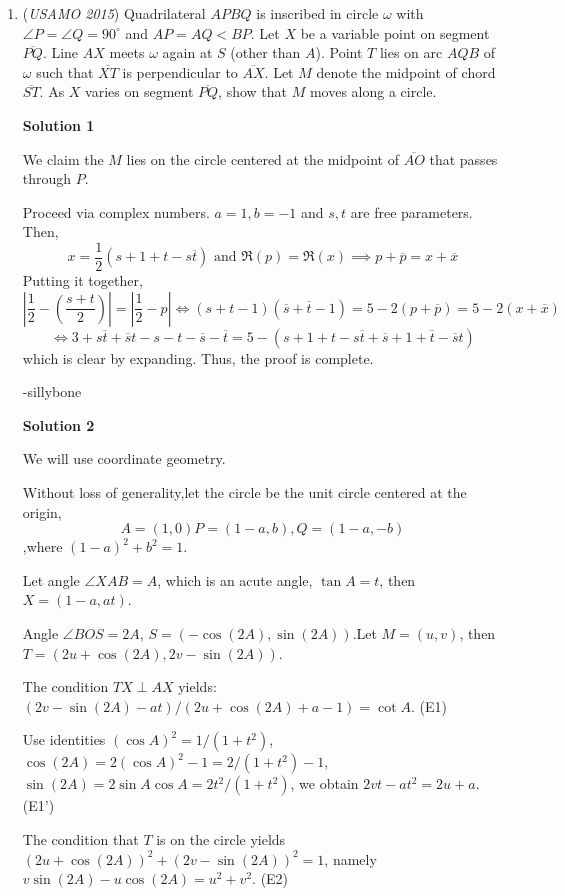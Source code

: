 \begin{enumerate}
 


	\item (\textit{USAMO 2015}) Quadrilateral $APBQ$ is inscribed in circle $\omega$ with $\angle P = \angle Q = 90^{\circ}$ and $AP = AQ < BP$. Let $X$ be a variable point on segment $\overline{PQ}$. Line $AX$ meets $\omega$ again at $S$ (other than $A$). Point $T$ lies on arc $AQB$ of $\omega$ such that $\overline{XT}$ is perpendicular to $\overline{AX}$. Let $M$ denote the midpoint of chord $\overline{ST}$. As $X$ varies on segment $\overline{PQ}$, show that $M$ moves along a circle.


 



\textbf{Solution 1}

We claim the $M$ lies on the circle centered at the midpoint of $\overline{AO}$ that passes through $P$. 

 Proceed via complex numbers. $a=1, b=-1$ and $s, t$ are free parameters. Then, 
 \[x = \frac{1}{2} (s+1+t-s\overline{t}) \text{ and } \Re (p) = \Re (x) \implies p+\overline{p}=x+\overline{x}\] Putting it together, 
 \[\left| \frac{1}{2}-\left(\frac{s+t}{2}\right) \right| = \left| \frac{1}{2} - p \right| \iff (s+t-1)(\overline{s}+\overline{t}-1) = 5-2(p+\overline{p}) = 5 - 2(x+\overline{x})\] 
 \[\iff 3+s\overline{t}+\overline{s}t-s-t-\overline{s}-\overline{t}=5-(s+1+t-s\overline{t}+\overline{s}+1+\overline{t}-\overline{s}t)\] which is clear by expanding. Thus, the proof is complete.

 -sillybone

 



\textbf{Solution 2}

We will use coordinate geometry.

 Without loss of generality,let the circle be the unit circle centered at the origin, 
 \[A=(1,0) P=(1-a,b), Q=(1-a,-b)\],where $(1-a)^2+b^2=1$.

 Let angle $\angle XAB=A$, which is an acute angle, $\tan{A}=t$, then $X=(1-a,at)$.

 Angle $\angle BOS=2A$, $S=(-\cos(2A),\sin(2A))$.Let $M=(u,v)$, then $T=(2u+\cos(2A), 2v-\sin(2A))$.

 The condition $TX \perp AX$ yields: $(2v-\sin(2A)-at)/(2u+\cos(2A)+a-1)=\cot A.$     (E1)

 Use identities $(\cos A)^2=1/(1+t^2)$,  $\cos(2A)=2(\cos A)^2-1= 2/(1+t^2) -1$, $\sin(2A)=2\sin A\cos A=2t^2/(1+t^2)$, we obtain $2vt-at^2=2u+a$.   (E1')

 The condition that $T$ is on the circle yields $(2u+\cos(2A))^2+ (2v-\sin(2A))^2=1$, namely $v\sin(2A)-u\cos(2A)=u^2+v^2$.   (E2)


\end{enumerate}

